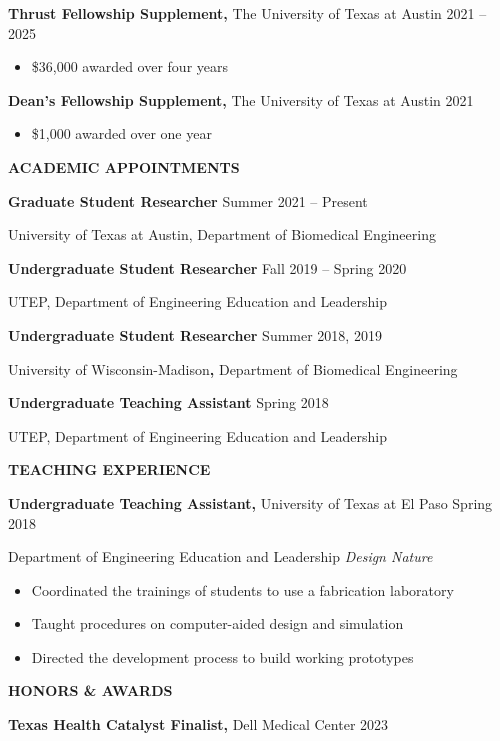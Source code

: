 \documentclass[11pt]{article}
\newcommand{\sectionheading}[1]{%
  \vspace{1.6ex}%
  {\large\bfseries\MakeUppercase{#1}}\par\vspace{0.6ex}%
}
\begin{document}
\textbf{Thrust Fellowship Supplement,} The University of Texas at Austin 2021 -- 2025

\begin{itemize}
\item
  \$36,000 awarded over four years
\end{itemize}

\textbf{Dean's Fellowship Supplement,} The University of Texas at Austin 2021

\begin{itemize}
\item
  \$1,000 awarded over one year
\end{itemize}

\sectionheading{ACADEMIC APPOINTMENTS}

\textbf{Graduate Student Researcher} Summer 2021 -- Present

University of Texas at Austin, Department of Biomedical Engineering

\textbf{Undergraduate Student Researcher} Fall 2019 -- Spring 2020

UTEP, Department of Engineering Education and Leadership

\textbf{Undergraduate Student Researcher} Summer 2018, 2019

University of Wisconsin-Madison\textbf{,} Department of Biomedical Engineering

\textbf{Undergraduate Teaching Assistant} Spring 2018

UTEP, Department of Engineering Education and Leadership

\sectionheading{TEACHING EXPERIENCE}

\textbf{Undergraduate Teaching Assistant,} University of Texas at El Paso Spring 2018

Department of Engineering Education and Leadership \textbar{} \emph{Design Nature}

\begin{itemize}
\item
  Coordinated the trainings of students to use a fabrication laboratory
\item
  Taught procedures on computer-aided design and simulation
\item
  Directed the development process to build working prototypes
\end{itemize}

\sectionheading{HONORS & AWARDS}

\textbf{Texas Health Catalyst Finalist,} Dell Medical Center 2023
\end{document}
